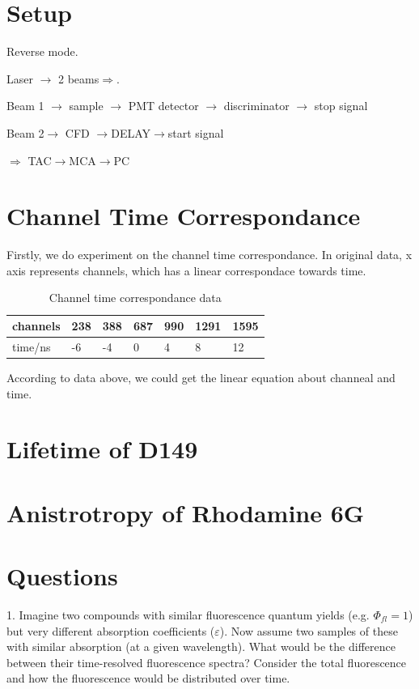 \documentclass{article}
\begin{document}
\section{Setup} 
Reverse mode.\par 
Laser $\longrightarrow$ 2 beams$\Rightarrow$.\par 
Beam 1 $\longrightarrow$ sample $\longrightarrow$ PMT detector $\longrightarrow$ discriminator $\longrightarrow$ stop signal\par 
Beam 2$\longrightarrow$ CFD $\longrightarrow$DELAY$\longrightarrow$start signal \par 
$\Rightarrow$ TAC$\longrightarrow$MCA$\longrightarrow$PC

\section{Channel Time Correspondance}
Firstly, we do experiment on the channel time correspondance. In original data, x axis represents channels, which has a linear correspondace towards time.\par 

\begin{table}[]
\centering
\caption{Channel time correspondance data}
\label{my-label}
\begin{tabular}{@{}lllllll@{}}
\toprule
channels & 238 & 388 & 687 & 990 & 1291 & 1595\\ \midrule
time/ns  & -6  & -4  & 0   &   4 & 8 & 12\\
\bottomrule
\end{tabular}
\end{table}
According to data above, we could get the linear equation about channeal and time.

\section{Lifetime of D149}

\section{Anistrotropy of Rhodamine 6G}








\section{Questions}
1.  Imagine two compounds with similar fluorescence quantum yields (e.g. $\Phi_{fl} = 1$) but very different
absorption coefficients ($\varepsilon$). Now assume two samples of these with similar absorption (at a given
wavelength). What would be the difference between their time-resolved fluorescence spectra? Consider
the total fluorescence and how the fluorescence would be distributed over time.\\ \par 
\end{document}
